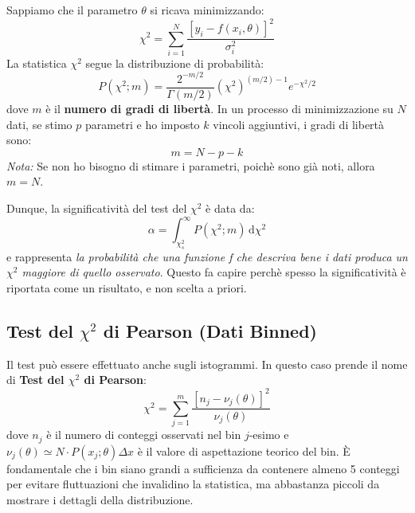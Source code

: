 \documentclass[openany,a4paper,12pt]{book}
\theoremstyle{remark}
\begin{document}
Sappiamo che il parametro $\theta$ si ricava minimizzando:
\begin{equation*}
    \chi^2 = \sum_{i=1}^N \frac{[y_i - f(x_i, \theta)]^2}{\sigma_i^2}
\end{equation*}
La statistica $\chi^2$ segue la distribuzione di probabilità:
\begin{equation}
    P(\chi^2; m) = \frac{2^{-m/2}}{\Gamma(m/2)} (\chi^2)^{(m/2)-1} e^{-\chi^2/2}
\end{equation}
dove $m$ è il \textbf{numero di gradi di libertà}. In un processo di minimizzazione su $N$ dati, se stimo $p$ parametri e ho imposto $k$ vincoli aggiuntivi, i gradi di libertà sono:
\begin{equation}
    m = N - p - k
\end{equation}
\textit{Nota:} Se non ho bisogno di stimare i parametri, poichè sono già noti, allora $m=N$.

Dunque, la significatività del test del $\chi^2$ è data da:
\begin{equation}
    \alpha = \int_{\chi^2_s}^{\infty} P(\chi^2; m) \, \mathrm{d}\chi^2
\end{equation}
e rappresenta \textit{la probabilità che una funzione f che descriva bene i dati produca un $\chi^2$ maggiore di quello osservato}. Questo fa capire perchè spesso 
la significatività è riportata come un risultato, e non scelta a priori. 

\subsection*{Test del $\chi^2$ di Pearson (Dati Binned)}
Il test può essere effettuato anche sugli istogrammi. In questo caso prende il nome di \textbf{Test del $\chi^2$ di Pearson}:
\begin{equation}
    \chi^2 = \sum_{j=1}^m \frac{[n_j - \nu_j(\theta)]^2}{\nu_j(\theta)}
\end{equation}
dove $n_j$ è il numero di conteggi osservati nel bin $j$-esimo e $\nu_j(\theta) \simeq N \cdot P(x_j; \theta)\Delta x$ è il valore di aspettazione teorico del bin. È fondamentale che i bin siano grandi a sufficienza da contenere almeno 5 conteggi per evitare fluttuazioni che invalidino la statistica, ma abbastanza piccoli da mostrare i dettagli della distribuzione.
\end{document}
